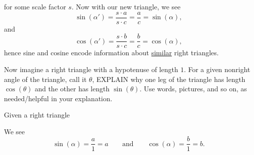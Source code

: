 \documentclass[noauthor,nooutcomes,12pt]{ximera}
\begin{document}
\begin{question}
\begin{freeResponse}
\begin{center}
    \end{center}
    for some scale factor $s$. Now with our new triangle, we see
    \[
    \sin(\alpha') = \frac{s\cdot a}{s\cdot c} = \frac{a}{c} =
    \sin(\alpha),
    \]
    and
    \[
    \cos(\alpha') = \frac{s\cdot b}{s\cdot c} = \frac{b}{c} =
    \cos(\alpha),
    \]
    hence sine and cosine encode information about \underline{similar} right
    triangles.
  \end{freeResponse}
\end{question}
\mynewpage

\begin{question}
  Now imagine a right triangle with a hypotenuse of length $1$. For a
  given nonright angle of the triangle, call it $\theta$, EXPLAIN why
  one leg of the triangle has length $\cos(\theta)$ and the other has
  length $\sin(\theta)$.  Use words, pictures, and so on, as
  needed/helpful in your explanation.
  \begin{freeResponse}
    Given a right triangle
    \begin{center}
    \end{center}
    We see
    \[
    \sin(\alpha) = \frac{a}{1} = a\qquad \text{and}\qquad \cos(\alpha) = \frac{b}{1} = b.
    \]
  \end{freeResponse}
\end{question}
\mynewpage
\end{document}
